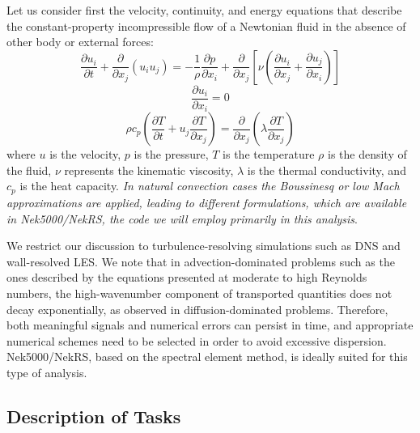 \documentclass[11pt,letterpaper,english]{article}
\begin{document}
Let us consider first  the velocity, continuity, and energy  equations that describe the constant-property incompressible flow of a Newtonian fluid in the absence of other body or external forces:
\begin{equation}
\frac{\partial  u_i  }{\partial t} +  \frac{\partial}{\partial x_j} \left( u_i u_j \right) =-\frac{1}{\rho} \frac{\partial p}{\partial x_i} + \frac{\partial}{\partial x_j} \left[ \nu \left( \frac{\partial u_i}{\partial x_j} +\frac{\partial u_j}{\partial x_i} \right) \right]
\label{UEqn}
\end{equation}
\begin{equation}
\frac{\partial u_i}{\partial x_i} = 0
\label{rhoEqn}
\end{equation}
\begin{equation}
\rho c_p \left( \frac{\partial T }{\partial t} + u_j \frac{\partial T}{\partial x_j} \right) = \frac{\partial }{\partial x_j} \left( \lambda \frac{\partial T}{\partial x_j} \right)
\label{EEqn}
\end{equation}
where $u$ is the velocity, $p$ is the pressure, $T$ is the temperature $\rho$ is the  density of the fluid, $\nu$ represents the kinematic viscosity, $\lambda$ is the thermal conductivity, and $c_p$ is the heat capacity. \textit{In natural convection cases the Boussinesq or low Mach approximations} \cite{tomboulides1997numerical} \textit{are applied, leading to different formulations, which are available in Nek5000/NekRS, the code we will employ primarily in this analysis}.

We restrict our discussion to turbulence-resolving simulations such as DNS and wall-resolved LES. We note that in advection-dominated problems such as the ones described by the equations presented at moderate to high Reynolds numbers, the high-wavenumber component of transported quantities does not decay exponentially, as observed in diffusion-dominated problems. Therefore, both meaningful signals and numerical errors can persist in time, and appropriate numerical schemes need to be selected in order to avoid excessive dispersion. Nek5000/NekRS, based on the spectral element method, is ideally suited for this type of analysis.

\vspace{-.25in}
\subsection{Description of Tasks}
\vspace{-.2in}
\end{document}
